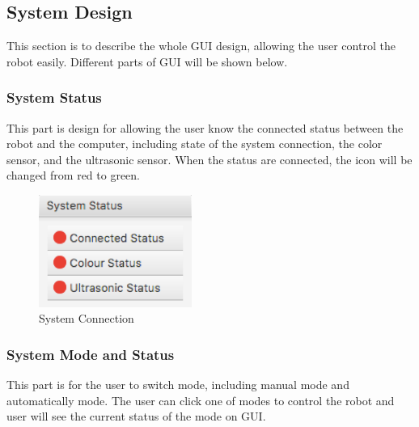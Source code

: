 \documentclass[10pt,a4paper,titlepage]{article}
\begin{document}
  \subsection{System Design} 
  This section is to describe the whole GUI design, allowing the user control the robot easily. Different parts of GUI will be shown below. 
  \subsubsection{System Status} 
  This part is design for allowing the user know the connected status between the robot and the computer, including state of the system connection, the color sensor, and the ultrasonic sensor. When the status are connected, the icon will be changed from red to green.   
  \begin{figure}[H] 
  \includegraphics[width=50mm, scale=0.5]{systemconnect.png}  %
  \caption{System Connection} 
  \label{fig:System Connection}               
  \end{figure}

   
  \subsubsection{System Mode and Status} 
  This part is for the user to switch mode, including manual mode and automatically mode. The user can click one of modes to control the robot and user will see the current status of the mode on GUI.  
\end{document}
